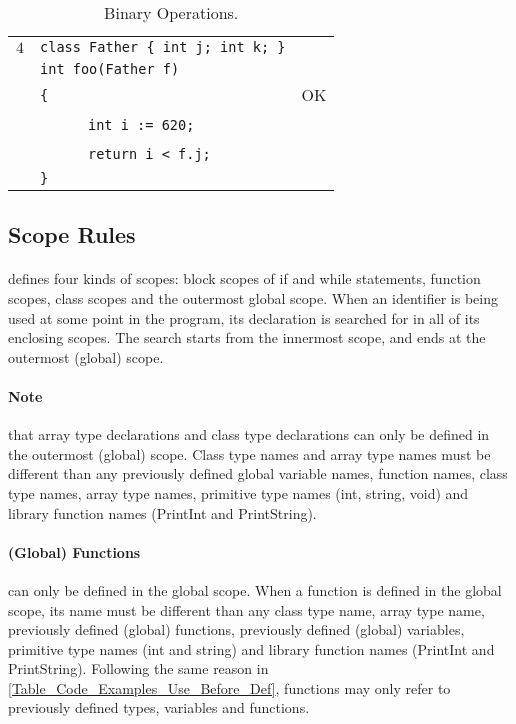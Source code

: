 \documentclass{article}
\begin{document}
\begin{table}[h]
\begin{tabular}{|l|l|l|}
\hline
 $4$ & \verb"class Father { int j; int k; }" &    \\
     & \verb"int foo(Father f)"              &    \\
     & \verb"{"                              & OK \\
     & ~ ~ ~ ~\verb"int i := 620;"           &    \\
     & ~ ~ ~ ~\verb"return i < f.j;"         &    \\
     & \verb"}"                              &    \\
\hline
\end{tabular}
\caption{Binary Operations.
\label{Table_Code_Examples_Binary_Operations}}
\end{table}
\subsection{Scope Rules}
\label{subsection_Scope_Rules}
\paragraph{\plname} defines four kinds of scopes:
block scopes of if and while statements,
function scopes,
class scopes and
the outermost global scope.
When an identifier is being used at some point in the program,
its declaration is searched for in all of its enclosing scopes.
The search starts from the innermost scope, 
and ends at the outermost (global) scope.
\paragraph{Note} that array type declarations and
class type declarations can only be defined
in the outermost (global) scope.
Class type names and array type names must be different than any
previously defined global variable names, function names, class type names,
array type names, primitive type names (int, string, void) and library function names
(PrintInt and PrintString).
\paragraph{(Global) Functions} can only be defined in the global scope.
When a function is defined in the global scope, its name must be different than
any class type name, array type name, previously defined (global) functions,
previously defined (global) variables,
primitive type names (int and string) and library function names (PrintInt and PrintString).
Following the same reason in \ref{Table_Code_Examples_Use_Before_Def},
functions may only refer to previously defined types, variables and functions.
\end{document}

